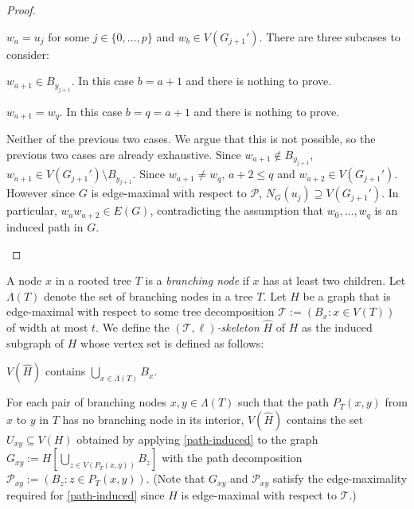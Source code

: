 \documentclass[kpfonts]{patmorin}
\theoremstyle{named}
\begin{document}
\begin{proof}
\begin{compactenum}
       \item $w_a = u_j$ for some $j\in\{0,\ldots,p\}$ and $w_b\in V(G_{j+1}')$.  There are three subcases to consider:
       \begin{compactenum}
            \item $w_{a+1}\in B_{y_{j+1}}$.  In this case $b=a+1$ and there is nothing to prove.

            \item $w_{a+1}=w_q$. In this case $b=q=a+1$ and there is nothing to prove.

            \item Neither of the previous two cases. We argue that this is not possible, so the previous two cases are already exhaustive.  Since $w_{a+1}\not\in B_{y_{j+1}}$, $w_{a+1}\in V(G_{j+1}')\setminus B_{y_{j+1}}$. Since $w_{a+1}\neq w_q$, ${a+2}\le q$ and $w_{a+2}\in V(G_{j+1}')$.  However since $G$ is edge-maximal with respect to $\mathcal{P}$, $N_G(u_j)\supseteq V(G_{j+1}')$. In particular, $w_aw_{a+2}\in E(G)$, contradicting the assumption that $w_0,\ldots,w_q$ is an induced path in $G$. \qedhere
        \end{compactenum}
    \end{compactenum}
\end{proof}

A node $x$ in a rooted tree $T$ is a \emph{branching node} if $x$ has at least two children.  Let $\Lambda(T)$ denote the set of branching nodes in a tree $T$.  Let $H$ be a graph that is edge-maximal with respect to some tree decomposition $\mathcal{T}:=(B_x:x\in V(T))$ of width at most $t$. We define the \emph{$(\mathcal{T},\ell)$-skeleton} $\hat{H}$ of $H$ as the induced subgraph of $H$ whose vertex set is defined as follows:
\begin{compactenum}
    \item $V(\hat{H})$ contains $\bigcup_{x\in\Lambda(T)} B_x$.

    \item For each pair of branching nodes $x,y\in\Lambda(T)$ such that the path $P_T(x,y)$ from $x$ to $y$ in $T$ has no branching node in its interior, $V(\hat{H})$ contains the set $U_{xy}\subseteq V(H)$ obtained by applying \cref{path-induced} to the graph $G_{xy}:=H[\bigcup_{z\in V(P_T(x,y))} B_z]$ with the path decomposition $\mathcal{P}_{xy}:=(B_z:z\in P_T(x,y))$.  (Note that $G_{xy}$ and $\mathcal{P}_{xy}$ satisfy the edge-maximality required for \cref{path-induced} since $H$ is edge-maximal with respect to $\mathcal{T}$.)
\end{compactenum}
\end{document}
